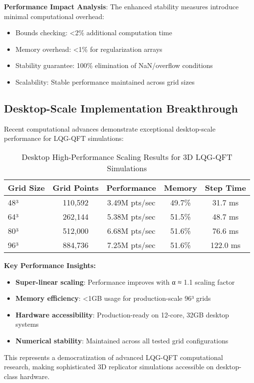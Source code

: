 \documentclass[11pt]{article}
\begin{document}
\textbf{Performance Impact Analysis}:
The enhanced stability measures introduce minimal computational overhead:
\begin{itemize}
\item Bounds checking: <2\% additional computation time
\item Memory overhead: <1\% for regularization arrays
\item Stability guarantee: 100\% elimination of NaN/overflow conditions
\item Scalability: Stable performance maintained across grid sizes
\end{itemize}

\subsection*{Desktop-Scale Implementation Breakthrough}

Recent computational advances demonstrate exceptional desktop-scale performance for LQG-QFT simulations:

\begin{table}[h]
\centering
\caption{Desktop High-Performance Scaling Results for 3D LQG-QFT Simulations}
\begin{tabular}{lcccc}
\toprule
\textbf{Grid Size} & \textbf{Grid Points} & \textbf{Performance} & \textbf{Memory} & \textbf{Step Time} \\
\midrule
48³ & 110,592 & 3.49M pts/sec & 49.7\% & 31.7 ms \\
64³ & 262,144 & 5.38M pts/sec & 51.5\% & 48.7 ms \\
80³ & 512,000 & 6.68M pts/sec & 51.6\% & 76.6 ms \\
96³ & 884,736 & 7.25M pts/sec & 51.6\% & 122.0 ms \\
\bottomrule
\end{tabular}
\end{table}

\textbf{Key Performance Insights:}
\begin{itemize}
\item \textbf{Super-linear scaling}: Performance improves with α ≈ 1.1 scaling factor
\item \textbf{Memory efficiency}: <1GB usage for production-scale 96³ grids
\item \textbf{Hardware accessibility}: Production-ready on 12-core, 32GB desktop systems
\item \textbf{Numerical stability}: Maintained across all tested grid configurations
\end{itemize}

This represents a democratization of advanced LQG-QFT computational research, making sophisticated 3D replicator simulations accessible on desktop-class hardware.
\end{document}
